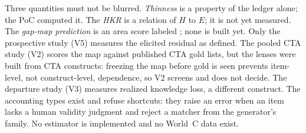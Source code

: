 \evint{} Three quantities must not be blurred. \emph{Thinness} is a property of the ledger alone; the
PoC computed it. The \emph{HKR} is a relation of $H$ to $E$; it is not yet measured. The \emph{gap-map
prediction} is an area score labeled ; none is built yet. Only the prospective study (V5)
measures the elicited residual as defined. The pooled CTA study (V2) scores the map against published
CTA gold lists, but the lenses were built from CTA constructs: freezing the map before gold is seen
prevents item-level, not construct-level, dependence, so V2 screens and does not decide. The departure study (V3) measures realized knowledge loss, a
different construct. \evobs{} The accounting types exist and refuse shortcuts: they raise an error when
an item lacks a human validity judgment and reject a matcher from the generator's family. No estimator
is implemented and no World~C data exist.
